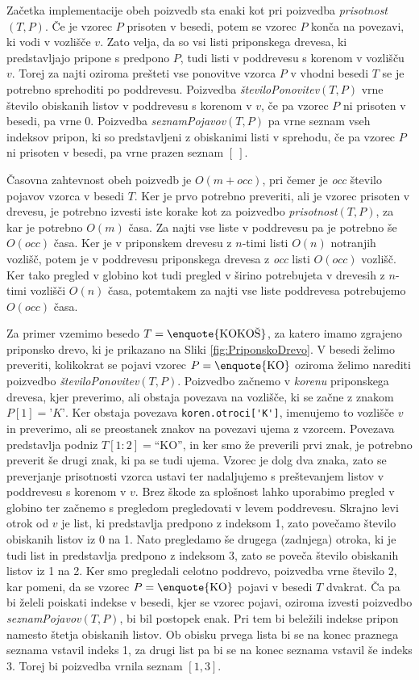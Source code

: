 Začetka implementacije obeh poizvedb sta enaki kot pri poizvedba \textit{prisotnost}$(T,P)$. Če je vzorec $P$ prisoten v besedi, potem se vzorec $P$ konča na povezavi, ki vodi v vozlišče $v$. Zato velja, da so vsi listi priponskega drevesa, ki predstavljajo pripone s predpono $P$, tudi listi v poddrevesu s korenom v vozlišču $v$. Torej za najti oziroma prešteti vse ponovitve vzorca $P$ v vhodni besedi $T$ se je potrebno sprehoditi po poddrevesu. Poizvedba \textit{številoPonovitev}$(T,P)$ vrne število obiskanih listov v poddrevesu s korenom v $v$, če pa vzorec $P$ ni prisoten v besedi, pa vrne $0$. Poizvedba \textit{seznamPojavov}$(T,P)$ pa vrne seznam vseh indeksov pripon, ki so predstavljeni z obiskanimi listi v sprehodu, če pa vzorec $P$ ni prisoten v besedi, pa vrne prazen seznam $[~]$.

Časovna zahtevnost obeh poizvedb je $O(m+\textit{occ})$, pri čemer je \textit{occ} število pojavov vzorca v besedi $T$. Ker je prvo potrebno preveriti, ali je vzorec prisoten v drevesu, je potrebno izvesti iste korake kot za poizvedbo \textit{prisotnost}$(T,P)$, za kar je potrebno $O(m)$ časa. Za najti vse liste v poddrevesu pa je potrebno še $O(\textit{occ})$ časa. Ker je v priponskem drevesu z $n$-timi listi $O(n)$ notranjih vozlišč, potem je v poddrevesu priponskega drevesa z \textit{occ} listi $O(\textit{occ})$ vozlišč. Ker tako pregled v globino kot tudi pregled v širino potrebujeta v drevesih z $n$-timi vozlišči $O(n)$ časa, potemtakem za najti vse liste poddrevesa potrebujemo $O(\textit{occ})$ časa.

Za primer vzemimo besedo $T=\text{\enquote{KOKOŠ}}$, za katero imamo zgrajeno priponsko drevo, ki je prikazano na Sliki \ref{fig:PriponskoDrevo}. V besedi želimo preveriti, kolikokrat se pojavi vzorec $P=\text{\enquote{KO}}$ oziroma želimo narediti poizvedbo \textit{številoPonovitev}$(T,P)$. Poizvedbo začnemo v \textit{korenu} priponskega drevesa, kjer preverimo, ali obstaja povezava na vozlišče, ki se začne z znakom $P[1]=\textit{'K'}$. Ker obstaja povezava \verb|koren.otroci['K']|, imenujemo to vozlišče $v$ in preverimo, ali se preostanek znakov na povezavi ujema z vzorcem. Povezava predstavlja podniz $T[1:2]=$\enquote{KO}, in ker smo že preverili prvi znak, je potrebno preverit še drugi znak, ki pa se tudi ujema. Vzorec je dolg dva znaka, zato se preverjanje prisotnosti vzorca ustavi ter nadaljujemo s preštevanjem listov v poddrevesu s korenom v $v$. Brez škode za splošnost lahko uporabimo pregled v globino ter začnemo s pregledom pregledovati v levem poddrevesu. Skrajno levi otrok od $v$ je list, ki predstavlja predpono z indeksom 1, zato povečamo število obiskanih listov iz 0 na 1. Nato pregledamo še drugega (zadnjega) otroka, ki je tudi list in predstavlja predpono z indeksom 3, zato se poveča število obiskanih listov iz 1 na 2. Ker smo pregledali celotno poddrevo, poizvedba vrne število 2, kar pomeni, da se vzorec $P=\text{\enquote{KO}}$ pojavi v besedi $T$ dvakrat. Ča pa bi želeli poiskati indekse v besedi, kjer se vzorec pojavi, oziroma izvesti poizvedbo \textit{seznamPojavov}$(T,P)$, bi bil postopek enak. Pri tem bi beležili indekse pripon namesto štetja obiskanih listov. Ob obisku prvega lista bi se na konec praznega seznama vstavil indeks 1, za drugi list pa bi se na konec seznama vstavil še indeks 3. Torej bi poizvedba vrnila seznam $[1,3]$.